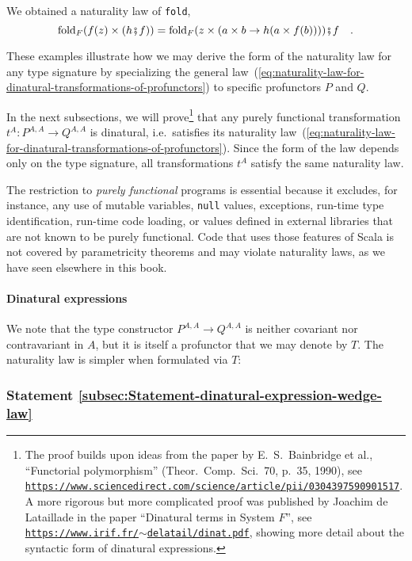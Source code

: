 We obtained a naturality law of \lstinline!fold!,
\[
\text{fold}_{F}(f(z)\times(h\bef f))=\text{fold}_{F}(z\times(a\times b\rightarrow h(a\times f(b))))\bef f\quad.
\]

These examples illustrate how we may derive the form of the naturality
law for any type signature by specializing the general law~(\ref{eq:naturality-law-for-dinatural-transformations-of-profunctors})
to specific profunctors $P$ and $Q$.

In the next subsections, we will prove\footnote{The proof builds upon ideas from the paper by E.~S.~Bainbridge et
al., \textsf{``}Functorial polymorphism\textsf{''} (Theor.~Comp.~Sci.~70, p.~35,
1990), see \texttt{\href{https://www.sciencedirect.com/science/article/pii/0304397590901517}{https://www.sciencedirect.com/science/article/pii/0304397590901517}}.
A more rigorous but more complicated proof was published by Joachim
de Lataillade in the paper \textsf{``}Dinatural
terms in System $F$\textsf{''}, see \texttt{\href{https://www.irif.fr/~delatail/dinat.pdf}{https://www.irif.fr/$\sim$delatail/dinat.pdf}},
showing more detail about the syntactic form of dinatural expressions. } that any purely functional transformation $t^{A}:P^{A,A}\rightarrow Q^{A,A}$
is dinatural, i.e.~satisfies its naturality law~(\ref{eq:naturality-law-for-dinatural-transformations-of-profunctors}).
Since the form of the law depends only on the type signature, all
transformations $t^{A}$ satisfy the same naturality law. 

The restriction to \emph{purely functional} programs
is essential because it excludes, for instance, any use of mutable
variables, \lstinline!null! values, exceptions, run-time type identification,
run-time code loading, or values defined in external libraries that
are not known to be purely functional. Code that uses those features
of Scala is not covered by parametricity theorems and may violate
naturality laws, as we have seen elsewhere in this book.

\paragraph{Dinatural expressions}

We note that the type constructor $P^{A,A}\rightarrow Q^{A,A}$ is
neither covariant nor contravariant in $A$, but it is itself a profunctor
that we may denote by $T$. The naturality law is simpler when formulated
via $T$:

\subsubsection{Statement \label{subsec:Statement-dinatural-expression-wedge-law}\ref{subsec:Statement-dinatural-expression-wedge-law}}

